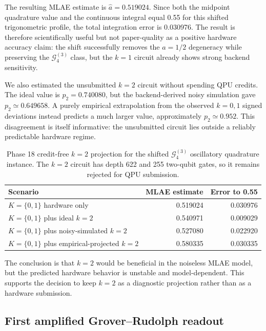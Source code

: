 The resulting MLAE estimate is \(\hat a=0.519024\). Since both the midpoint
quadrature value and the continuous integral equal 0.55 for this shifted
trigonometric profile, the total integration error is 0.030976. The result is
therefore scientifically useful but not paper-quality as a positive hardware
accuracy claim: the shift successfully removes the \(a=1/2\) degeneracy while
preserving the \(\mathcal{G}^{(3)}_4\) class, but the \(k=1\) circuit already
shows strong backend sensitivity.

We also estimated the unsubmitted \(k=2\) circuit without spending QPU credits.
The ideal value is \(p_2=0.740080\), but the backend-derived noisy simulation
gave \(p_2\simeq0.649658\). A purely empirical extrapolation from the observed
\(k=0,1\) signed deviations instead predicts a much larger value,
approximately \(p_2\simeq0.952\). This disagreement is itself informative: the
unsubmitted circuit lies outside a reliably predictable hardware regime.

\begin{table}[h]
\centering
\begin{tabular}{lrr}
\toprule
Scenario & MLAE estimate & Error to 0.55 \\
\midrule
\(K=\{0,1\}\) hardware only & 0.519024 & 0.030976 \\
\(K=\{0,1\}\) plus ideal \(k=2\) & 0.540971 & 0.009029 \\
\(K=\{0,1\}\) plus noisy-simulated \(k=2\) & 0.527080 & 0.022920 \\
\(K=\{0,1\}\) plus empirical-projected \(k=2\) & 0.580335 & 0.030335 \\
\bottomrule
\end{tabular}
\caption{Phase 18 credit-free \(k=2\) projection for the shifted
\(\mathcal{G}^{(3)}_4\) oscillatory quadrature instance. The \(k=2\) circuit
has depth 622 and 255 two-qubit gates, so it remains rejected for QPU
submission.}
\label{tab:phase18-k2-projection}
\end{table}

The conclusion is that \(k=2\) would be beneficial in the noiseless MLAE model,
but the predicted hardware behavior is unstable and model-dependent. This
supports the decision to keep \(k=2\) as a diagnostic projection rather than as
a hardware submission.

\subsection{First amplified Grover--Rudolph readout}

